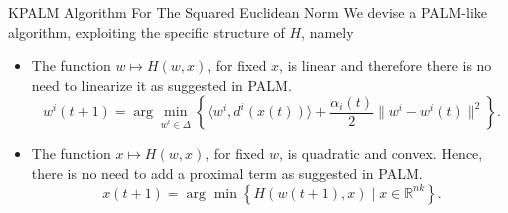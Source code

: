 \documentclass[9pt,handout]{beamer} %
\begin{document}
	\begin{frame}{KPALM Algorithm For The Squared Euclidean Norm}
		We devise a PALM-like algorithm, exploiting the specific structure of $H$, namely
		\pause
		\begin{itemize}[<+->]
	    	\item The function $w \mapsto H(w,x)$, for fixed $x$, is linear and therefore there is no need to linearize it as suggested in PALM.
	    	\begin{equation*}
				w^i(t+1) = \arg\!\min\limits_{w^i \in \Delta} \left\lbrace \langle w^i , d^i(x(t)) \rangle + \frac{\alpha_i(t)}{2} \|w^i - w^i(t)\|^2 \right\rbrace. \label{W_update_step}
			\end{equation*}
	    	\item The function $x \mapsto H(w,x)$, for fixed $w$, is quadratic and convex. Hence, there is no need to add a proximal term as suggested in PALM.
	    	\begin{equation*}
				x(t+1) = \arg\!\min \left\lbrace H(w(t+1), x) \mid x \in \mathbb{R}^{nk} \right\rbrace. \label{X_update_step}
			\end{equation*}
	    \end{itemize}
	    \pause
	    \begin{center}
       	\end{center}
	\end{frame}
	
\end{document}
